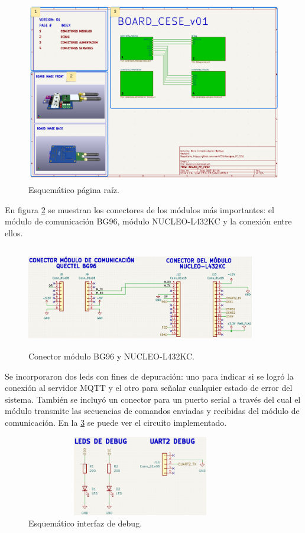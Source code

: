 \begin{figure}[h]
  \centering
	\includegraphics[width=\textwidth, height=8cm]{./Figures/esquematico_raiz.png}
	\caption{Esquemático página raíz.}
	\label{fig:esquematico root}
\end{figure}

En figura \ref{fig:esquematico modulos} se muestran los conectores de los módulos más importantes: el módulo de comunicación BG96, módulo NUCLEO-L432KC y la conexión entre ellos.

\begin{figure}[h]
  \centering
	\includegraphics[width=10cm, height=4.5cm]{./Figures/esquematico_modulos.png}
	\caption{Conector módulo BG96 y NUCLEO-L432KC.}
	\label{fig:esquematico modulos}
\end{figure}

Se incorporaron dos leds con fines de depuración: uno para indicar si se logró la  conexión al servidor MQTT y el otro para señalar cualquier estado de error del sistema. También se incluyó un conector para un puerto serial a través del cual el módulo transmite las secuencias de comandos enviadas y recibidas del módulo de comunicación. En la \ref{fig:esquematico conectores de debug} se puede ver el circuito implementado.
\begin{figure}[h!]
  \centering
	\includegraphics[width=10cm, height=3.5cm]{./Figures/esquematico_debug.png}
	\caption{Esquemático interfaz de debug.}
	\label{fig:esquematico conectores de debug}
\end{figure}

